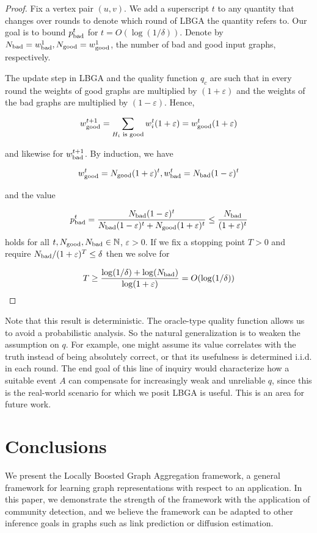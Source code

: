 \documentclass{article}
\begin{document}
\begin{proof}
Fix a vertex pair $(u,v)$. We add a superscript $t$ to any quantity that
changes over rounds to denote which round of LBGA the quantity refers to. Our
goal is to bound $p_{\textup{bad}}^t$ for $t = O(\log(1/ \delta))$. Denote by
$N_{\textup{bad}} = w_{\textup{bad}}^1, N_{\textup{good}} =
w^1_{\textup{good}}$, the number of bad and good input graphs, respectively. 

The update step in LBGA and the quality function $q_c$ are such that in every
round the weights of good graphs are multiplied by $(1 + \varepsilon)$ and the
weights of the bad graphs are multiplied by $(1 - \varepsilon)$. Hence, 

$$ w^{t+1}_{\textup{good}} = \sum_{H_i \textup{ is good}} w^t_i(1 + \varepsilon) =
w_{\textup{good}}^t (1 + \varepsilon)$$

and likewise for $w_{\textup{bad}}^{t+1}$. By induction, we have 

$$ w^t_{\textup{good}} = N_{\textup{good}} (1 + \varepsilon)^t,  
w^t_{\textup{bad}} = N_{\textup{bad}} (1 - \varepsilon)^t $$

and the value 

$$p_{\textup{bad}}^t =
\frac{N_{\textup{bad}}(1-\varepsilon)^t}{N_{\textup{bad}}(1-\varepsilon)^t +
N_{\textup{good}}(1+\varepsilon)^t} \leq \frac{N_{\textup{bad}}}{(1 +
\varepsilon)^t}$$
holds for all $t, N_{\textup{good}}, N_{\textup{bad}} \in \mathbb{N}$,
$\varepsilon > 0$. If we fix a stopping point $T > 0$ and require
$N_{\textup{bad}} / (1 + \varepsilon)^T \leq \delta$ then we solve for 

$$T \geq \frac{\log (1 / \delta) + \log(N_{\textup{bad}})}{\log (1 + \varepsilon)}
= O(\log(1/ \delta))$$
\end{proof}

Note that this result is deterministic. The oracle-type quality function allows
us to avoid a probabilistic analysis. So the natural generalization is to
weaken the assumption on $q$. For example, one might assume its value
correlates with the truth instead of being absolutely correct, or that its
usefulness is determined i.i.d. in each round. The end goal of this line of
inquiry would characterize how a suitable event $A$ can compensate for
increasingly weak and unreliable $q$, since this is the real-world scenario for
which we posit LBGA is useful.  This is an area for future work.

\section{Conclusions}
\label{sec:conclusion}
We present the Locally Boosted Graph Aggregation framework, a general framework
for learning graph representations with respect to an application. In this
paper, we demonstrate the strength of the framework with the application of
community detection, and we believe the framework can be adapted to other
inference goals in graphs such as link prediction or diffusion estimation. 
\end{document}
